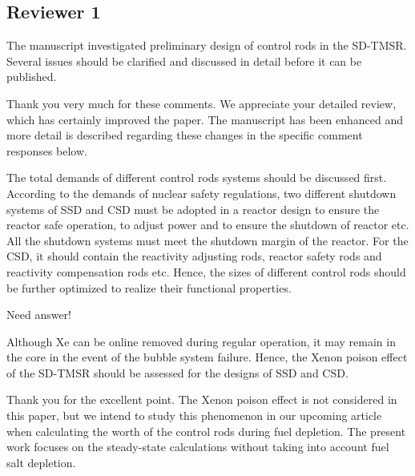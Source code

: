 \documentclass[answers,11pt]{exam}
\begin{document}
\begin{questions}
        \section*{Reviewer 1}

        \question The manuscript investigated preliminary design of control rods in the SD-TMSR. Several issues should be clarified and discussed in detail before it can be published.

        \begin{solution}
                Thank you very much for these comments. We appreciate your detailed review, which has certainly improved the paper. The manuscript has been enhanced and more detail is described regarding these changes in the specific comment responses below.
        \end{solution}


        \question  The total demands of different control rods systems should be discussed first. According to the demands of nuclear safety regulations, two different shutdown systems of SSD and CSD must be adopted in a reactor design to ensure the reactor safe operation, to adjust power and to ensure the shutdown of reactor etc. All the shutdown systems must meet the shutdown margin of the reactor. For the CSD, it should contain the reactivity adjusting rods, reactor safety rods and reactivity compensation rods etc. Hence, the sizes of different control rods should be further optimized to realize their functional properties.
        \begin{solution}
        		 
        		 Need answer!
        		  

        		    
        \end{solution}

        \question  Although Xe can be online removed during regular operation, it may remain in the core in the event of the bubble system failure. Hence, the Xenon poison effect of the SD-TMSR should be assessed for the designs of SSD and CSD. 
        \begin{solution}
		         
		         Thank you for the excellent point. The Xenon poison effect is not considered in this paper, but we intend to study this phenomenon in our upcoming article when calculating the worth of the control rods during fuel depletion. The present work focuses on the steady-state calculations without taking into account fuel salt depletion.
		         

\end{solution}
\end{questions}
\end{document}
